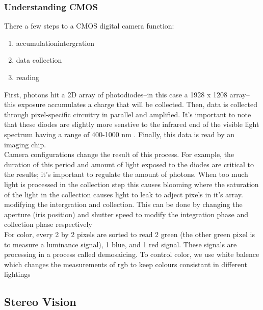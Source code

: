 \documentclass[twocolumn, letterpaper]{scrartcl}
\begin{document}
	\subsubsection*{Understanding CMOS}
	There a few steps to a CMOS digital camera function:
	\begin{enumerate}
		\item accumulation\/intergration
		\item data collection
		\item reading
	\end{enumerate}
	First, photons hit a 2D array of photodiodes--in this case a 1928 x 1208 array--this exposure accumulates a charge that will be collected. Then, data is collected through pixel-specific circuitry in parallel and amplified. It's important to note that these diodes are slightly more senstive to the infrared end of the visible light spectrum having a range of 400-1000 nm \parencite[p. 143]{SIEGWART2011}. Finally, this data is read by an imaging chip. 
	\\
	Camera configurations change the result of this process. For example, the duration of this period and amount of light exposed to the diodes are critical to the results; it's important to regulate the amount of photons. When too much light is processed in the collection step this causes blooming where the saturation of the light in the collection causes light to leak to adject pixels in it's array. modifying the intergration and collection.
	This can be done by changing the aperture (iris position) and shutter speed to modify the integration phase and collection phase respectively \parencite[p.143-145]{SIEGWART2011}
	\\
	For color, every 2 by 2 pixels are sorted to read 2 green (the other green pixel is to measure a luminance signal), 1 blue, and 1 red signal. These signals are processing in a process called demosaicing. To control color, we use white balence which changes the measurements of rgb to keep colours consistant in different lightings \parencite[p.146-147]{SIEGWART2011}
	
	\subsection*{Stereo Vision}
\end{document}
